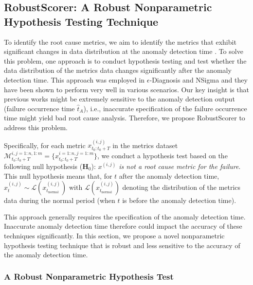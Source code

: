 \subsection{RobustScorer: A Robust Nonparametric Hypothesis Testing Technique} \label{sec:robustscorer}

To identify the root cause metrics, we aim to identify the metrics that exhibit significant changes in data distribution at the anomaly detection time \cite{Shan2019Ediagnosis, liu2023pyrca, Li2022Circa}. To solve this problem, one approach is to conduct hypothesis testing and test whether the data distribution of the metrics data changes significantly after the anomaly detection time. This approach was employed in $\epsilon$-Diagnosis \cite{Shan2019Ediagnosis, liu2023pyrca} and NSigma \cite{Li2022Circa} and they have been shown to perform very well in various scenarios. Our key insight is that previous works might be extremely sensitive to the anomaly detection output (failure occurrence time $\hat{t}_A$), i.e., inaccurate specification of the failure occurrence time might yield bad root cause analysis. Therefore, we propose RobustScorer to address this problem.

Specifically, for each metric $x_{t_0:t_0+T}^{(i,j)}$ in the metrics dataset $\mathcal{M}^{i,j=1:n,1:m}_{t_0:t_0+T}= \{x^{i=1:n,j=1:m}_{t_0:t_0+T}\}$, we conduct a hypothesis test based on the following null hypothesis ($\textbf{H}_0$):\textit{ $x^{(i,j)}$ is not a root cause metric for the failure}. This null hypothesis means that, for $t$ after the anomaly detection time, $x^{(i,j)}_t \sim \mathcal{L}(x^{(i,j)}_{t_\text{normal}})$ with $\mathcal{L}(x^{(i,j)}_{t_\text{normal}})$ denoting the distribution of the metrics data during the normal period (when $t$ is before the anomaly detection time).


This approach generally requires the specification of the anomaly detection time. Inaccurate anomaly detection time therefore could impact the accuracy of these techniques significantly. In this section, we propose a novel nonparametric hypothesis testing technique that is robust and less sensitive to the accuracy of the anomaly detection time.


\subsubsection{A Robust Nonparametric Hypothesis Test}

